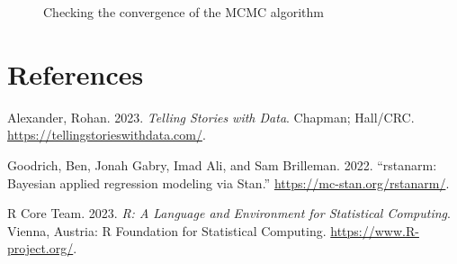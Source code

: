 \documentclass[
  letterpaper,
  DIV=11,
  numbers=noendperiod]{scrartcl}
\newlength{\cslhangindent}
\newlength{\cslentryspacingunit} %
\newenvironment{CSLReferences}[2] %
 {%
  \setlength{\parindent}{0pt}
  \ifodd #1
  \let\oldpar\par
  \def\par{\hangindent=\cslhangindent\oldpar}
  \fi
  \setlength{\parskip}{#2\cslentryspacingunit}
 }%
 {}
\begin{document}
\begin{figure}
\begin{minipage}[t]{0.50\linewidth}
{{}

}

\end{minipage}%

\caption{\label{fig-stanareyouokay}Checking the convergence of the MCMC
algorithm}

\end{figure}

\newpage

\hypertarget{references}{%
\section*{References}\label{references}}

\hypertarget{refs}{}
\begin{CSLReferences}{1}{0}
\leavevmode{}%
Alexander, Rohan. 2023. \emph{Telling Stories with Data}. Chapman;
Hall/CRC. \url{https://tellingstorieswithdata.com/}.

\leavevmode{}%
Goodrich, Ben, Jonah Gabry, Imad Ali, and Sam Brilleman. 2022.
{``{rstanarm: {Bayesian} applied regression modeling via {Stan}}.''}
\url{https://mc-stan.org/rstanarm/}.

\leavevmode{}%
R Core Team. 2023. \emph{{R: A Language and Environment for Statistical
Computing}}. Vienna, Austria: R Foundation for Statistical Computing.
\url{https://www.R-project.org/}.

\end{CSLReferences}
\end{document}
